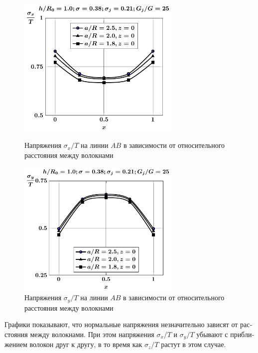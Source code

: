 \begin{russian}
\begin{figure}[h!]
\centering\footnotesize
\parbox[b]{7.5cm}{\centering\includegraphics[width=7.8cm]{inc5-a-sig_x.pdf}
\caption{Напряжения $\sigma_x/T$ на линии $AB$ в зависимости от относительного расстояния между волокнами
\label{f:7:74}}}\hfil\hfil
\parbox[b]{7.5cm}{\centering\includegraphics[width=7.8cm]{inc5-a-sig_y.pdf}
\caption{Напряжения $\sigma_y/T$ на линии $AB$ в зависимости от относительного расстояния между волокнами
\label{f:7:75}}}
\end{figure}

Графики показывают, что нормальные напряжения незначительно зависят от расстояния между волокнами. При этом напряжения $\sigma_x/T$ и $\sigma_y/T$ убывают с приближением волокон друг к другу, в то время как $\sigma_z/T$ растут в этом случае.


\end{russian}
